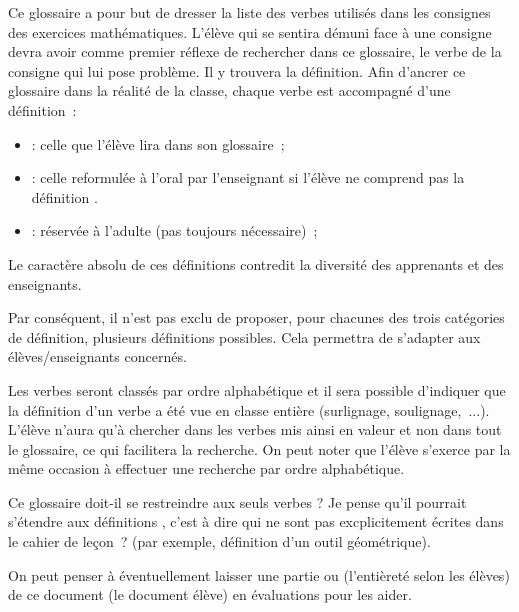 \documentclass{article}
\begin{document}
    Ce glossaire a pour but de dresser la liste des verbes utilisés dans les consignes
    des exercices mathématiques. L'élève qui se sentira démuni face à une consigne
    devra avoir comme premier réflexe de rechercher dans ce glossaire, le verbe de
    la consigne qui lui pose problème. Il y trouvera la définition.
    Afin d'ancrer ce glossaire dans la réalité de la classe, chaque verbe est
    accompagné d'une définition~:
    \begin{itemize}
        \item {} : celle que l'élève lira dans son glossaire~;
        \item {} : celle reformulée à l'oral par l'enseignant si l'élève ne
        comprend pas la définition .
        \item  {}: réservée à l'adulte (pas toujours nécessaire)~;
    \end{itemize}

    Le caractère absolu de ces définitions contredit la diversité des apprenants et
    des enseignants.

    Par conséquent, il n'est pas exclu de proposer, pour chacunes des trois catégories
    de définition, plusieurs définitions possibles. Cela permettra de s'adapter aux
    élèves/enseignants concernés.

    Les verbes seront classés par ordre alphabétique et il sera possible d'indiquer
    que la définition d'un verbe a été vue en classe entière (surlignage, soulignage,~...).
    L'élève n'aura qu'à chercher dans les verbes mis ainsi en valeur et non dans tout
    le glossaire, ce qui facilitera la recherche. On peut noter que l'élève s'exerce
    par la même occasion à effectuer une recherche par ordre alphabétique.

    Ce glossaire doit-il se restreindre aux seuls verbes ? Je pense qu'il pourrait
    s'étendre aux définitions , c'est à dire qui ne sont
    pas excplicitement écrites dans le cahier de leçon~? (par exemple, définition
    d'un outil géométrique).

    On peut penser à éventuellement laisser une partie ou (l'entièreté selon les élèves)
    de ce document (le document élève) en évaluations pour les aider.
    
    \newpage\showwords\wordlistnumfromtxt
\end{document}
